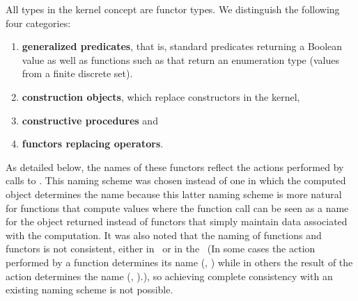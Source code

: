 All types in the kernel concept are functor types. We distinguish the
following four categories:
\begin{enumerate}
\item\textbf{generalized predicates}, that is, standard predicates
  returning a Boolean value as well as functions such as
   that return an enumeration type (values from a
  finite discrete set).
\item\textbf{construction objects}, which replace constructors in the
  kernel,
\item\textbf{constructive procedures} and
\item\textbf{functors replacing operators}.
\end{enumerate}

 As detailed below, the names of
these functors reflect the actions performed by calls to
.  This naming scheme was chosen instead of one in
which the computed object determines the name because this latter
naming scheme is more natural for functions that compute values where
the function call can be seen as a name for the object returned
instead of functors that simply maintain data associated with the
computation.  It was also noted that the naming of functions and
functors is not consistent, either in \cgal\ or in the \stl\ (In some
cases the action performed by a function determines its name (\eg,
) while in others the result of the action determines
the name (\eg, ).), so achieving complete consistency
with an existing naming scheme is not possible.


